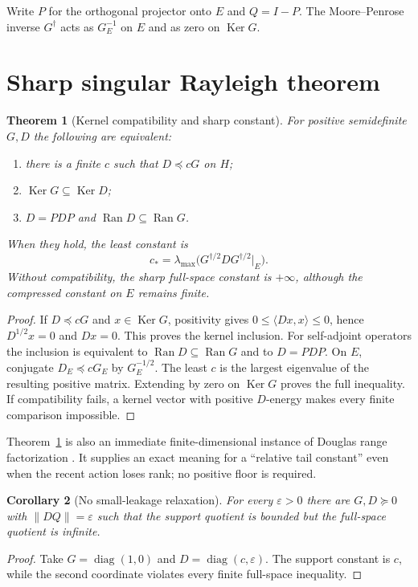 \documentclass[12pt]{article}
\newtheorem{theorem}{Theorem}
\newtheorem{corollary}[theorem]{Corollary}
\newcommand{\Ker}{\operatorname{Ker}}
\newcommand{\Ran}{\operatorname{Ran}}
\begin{document}
Write $P$ for the orthogonal projector onto $E$ and $Q=I-P$.  The
Moore--Penrose inverse $G^\dagger$ acts as $G_E^{-1}$ on $E$ and as zero on
$\Ker G$.

\section{Sharp singular Rayleigh theorem}
\begin{theorem}[Kernel compatibility and sharp constant]\label{thm:kernel}
For positive semidefinite $G,D$ the following are equivalent:
\begin{enumerate}
\item there is a finite $c$ such that $D\preceq cG$ on $H$;
\item $\Ker G\subseteq\Ker D$;
\item $D=PDP$ and $\Ran D\subseteq\Ran G$.
\end{enumerate}
When they hold, the least constant is
\[
 c_* = \lambda_{\max}
 \bigl(G^{\dagger/2}DG^{\dagger/2}\vert_E\bigr).
\]
Without compatibility, the sharp full-space constant is $+\infty$, although
the compressed constant on $E$ remains finite.
\end{theorem}

\begin{proof}
If $D\preceq cG$ and $x\in\Ker G$, positivity gives
$0\leq\langle Dx,x\rangle\leq0$, hence $D^{1/2}x=0$ and $Dx=0$.
This proves the kernel inclusion.  For self-adjoint operators the inclusion
is equivalent to $\Ran D\subseteq\Ran G$ and to $D=PDP$.  On $E$, conjugate
$D_E\preceq cG_E$ by $G_E^{-1/2}$.  The least $c$ is the largest eigenvalue
of the resulting positive matrix.  Extending by zero on $\Ker G$ proves the
full inequality.  If compatibility fails, a kernel vector with positive
$D$-energy makes every finite comparison impossible.
\end{proof}

Theorem~\ref{thm:kernel} is also an immediate finite-dimensional instance of
Douglas range factorization \citep{Douglas1966}.  It supplies an exact
meaning for a ``relative tail constant'' even when the recent action loses
rank; no positive floor is required.

\begin{corollary}[No small-leakage relaxation]\label{cor:leakage}
For every $\varepsilon>0$ there are $G,D\succeq0$ with
$\|D Q\|=\varepsilon$ such that the support quotient is bounded but the
full-space quotient is infinite.
\end{corollary}
\begin{proof}
Take $G=\operatorname{diag}(1,0)$ and
$D=\operatorname{diag}(c,\varepsilon)$.  The support constant is $c$, while
the second coordinate violates every finite full-space inequality.
\end{proof}
\end{document}
